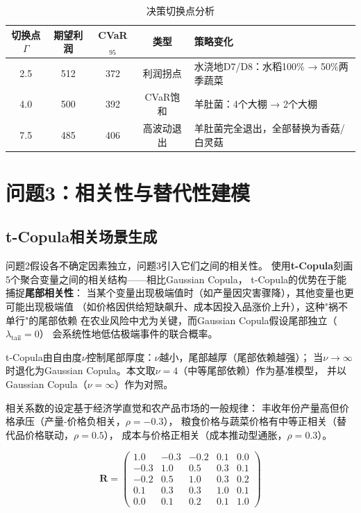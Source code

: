 \documentclass[12pt]{ctexart}
\begin{document}
\begin{table}[H]
\centering
\caption{决策切换点分析}
\label{tab:switching}
\begin{tabular}{@{}ccccp{4.5cm}@{}}
\toprule
\textbf{切换点$\Gamma$} & \textbf{期望利润} & \textbf{CVaR$_{95}$} & \textbf{类型} & \textbf{策略变化} \\
\midrule
2.5 & 512 & 372 & 利润拐点 & 水浇地D7/D8：水稻100\% → 50\%两季蔬菜 \\
4.0 & 500 & 392 & CVaR饱和 & 羊肚菌：4个大棚 → 2个大棚 \\
7.5 & 485 & 406 & 高波动退出 & 羊肚菌完全退出，全部替换为香菇/白灵菇 \\
\bottomrule
\end{tabular}
\end{table}

\section{问题3：相关性与替代性建模}

\subsection{t-Copula相关场景生成}

问题2假设各不确定因素独立，问题3引入它们之间的相关性。
使用\textbf{t-Copula}刻画5个聚合变量之间的相关结构——相比Gaussian Copula，
t-Copula的优势在于能捕捉\textbf{尾部相关性}：
当某个变量出现极端值时（如产量因灾害骤降），其他变量也更可能出现极端值
（如价格因供给短缺飙升、成本因投入品涨价上升），这种"祸不单行"的尾部依赖
在农业风险中尤为关键，而Gaussian Copula假设尾部独立（$\lambda_{\text{tail}}=0$）
会系统性地低估极端事件的联合概率。

t-Copula由自由度$\nu$控制尾部厚度：$\nu$越小，尾部越厚（尾部依赖越强）；
当$\nu\to\infty$时退化为Gaussian Copula。本文取$\nu=4$（中等尾部依赖）作为基准模型，
并以Gaussian Copula（$\nu=\infty$）作为对照。

相关系数的设定基于经济学直觉和农产品市场的一般规律\cite{broda2006}：
丰收年份产量高但价格承压（产量-价格负相关，$\rho=-0.3$），
粮食价格与蔬菜价格有中等正相关（替代品价格联动，$\rho=0.5$），
成本与价格正相关（成本推动型通胀，$\rho=0.3$）。

\begin{equation}
    \mathbf{R} = \begin{pmatrix}
    1.0 & -0.3 & -0.2 & 0.1 & 0.0 \\
    -0.3 & 1.0 & 0.5 & 0.3 & 0.1 \\
    -0.2 & 0.5 & 1.0 & 0.3 & 0.2 \\
    0.1 & 0.3 & 0.3 & 1.0 & 0.1 \\
    0.0 & 0.1 & 0.2 & 0.1 & 1.0
    \end{pmatrix}
\end{equation}
\end{document}
